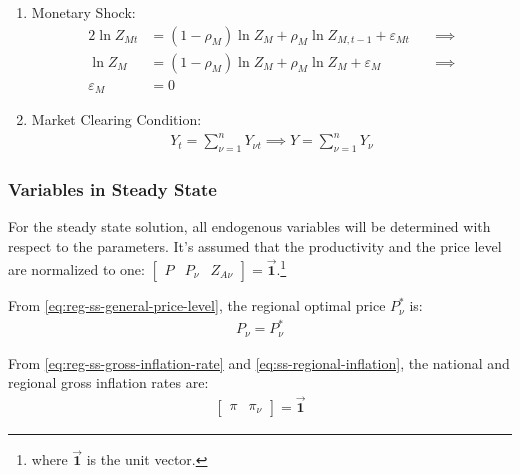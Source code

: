 \documentclass[
thesis.tex
]{subfiles}
\begin{document}
\begin{enumerate}
	\item Monetary Shock:
	\begin{alignat}{2}
		\ln{Z_{Mt}} &= (1-\rho_M)\ln{Z_{M}} + \rho_M\ln{Z_{M,t-1}} + \varepsilon_{Mt} \quad &\implies \nonumber \\
		\ln{Z_{M}} &= (1-\rho_M)\ln{Z_{M}} + \rho_M\ln{Z_{M}} + \varepsilon_{M} &\implies \nonumber \\
		\varepsilon_{M} &= 0 \label{eq:reg-ss-monetary-shock}
	\end{alignat}

	\item Market Clearing Condition:
	\begin{align}
		Y_t = \sum_{\nu=1}^{n} Y_{\nu t} \implies Y = \sum_{\nu=1}^{n} Y_{\nu} \label{eq:reg-ss-market-clearing-condition}
	\end{align}

\end{enumerate}


\subsubsection*{Variables in Steady State}


For the steady state solution, all endogenous variables will be determined with respect to the parameters. It's assumed that the productivity and the price level are normalized to one: $\left[ \begin{smallmatrix} P & P_\nu & Z_{A\nu} \end{smallmatrix} \right] = \vec{\bm{1}}$.\footnote{where $\vec{\bm{1}}$ is the unit vector.}

From \ref{eq:reg-ss-general-price-level}, the regional optimal price $P_{\nu}^\ast$ is:
\begin{align}
	P_{\nu} = P_{\nu}^\ast
\end{align}

From \ref{eq:reg-ss-gross-inflation-rate} and \ref{eq:ss-regional-inflation}, the national and regional gross inflation rates are:
\begin{align}
	\begin{bmatrix}
		\pi & \pi_{\nu}
	\end{bmatrix} = \vec{\bm{1}}
\end{align}
\end{document}
